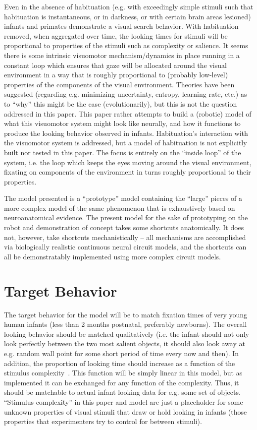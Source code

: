 \documentclass[12pt]{article}
\begin{document}
Even in the absence of habituation (e.g. with exceedingly simple
stimuli such that habituation is instantaneous, or in darkness, or
with certain brain areas lesioned) infants and primates demonstrate a
visual search behavior. With habituation removed, when aggregated over
time, the looking times for stimuli will be proportional to properties
of the stimuli such as complexity or salience. It seems there is some
intrinsic visuomotor mechanism/dynamics in place running in a constant
loop which ensures that gaze will be allocated around the visual
environment in a way that is roughly proportional to (probably
low-level) properties of the components of the visual
environment. Theories have been suggested (regarding e.g. minimizing
uncertainty, entropy, learning rate, etc.) as to ``why'' this might be
the case (evolutionarily), but this is not the question addressed in
this paper. This paper rather attempts to build a (robotic) model of
what this visuomotor system might look like neurally, and how it
functions to produce the looking behavior observed in
infants. Habituation's interaction with the visuomotor system is
addressed, but a model of habituation is not explicitly built nor
tested in this paper. The focus is entirely on the ``inside loop'' of
the system, i.e. the loop which keeps the eyes moving around the
visual environment, fixating on components of the environment in turns
roughly proportional to their properties.

The model presented is a ``prototype'' model containing the ``large''
pieces of a more complex model of the same phenomenon that is
exhaustively based on neuroanatomical evidence. The present model for
the sake of prototyping on the robot and demonstration of concept
takes some shortcuts anatomically. It does not, however, take
shortcuts mechanistically -- all mechanisms are accomplished via
biologically realistic continuous neural circuit models, and the
shortcuts can all be demonstratably implemented using more complex
circuit models.

\section{Target Behavior}
The target behavior for the model will be to match fixation times of
very young human infants (less than 2 months postnatal, preferably
newborns). The overall looking behavior should be matched
qualitatively (i.e.  the infant should not only look perfectly between
the two most salient objects, it should also look away at e.g. random
wall point for some short period of time every now and then). In
addition, the proportion of looking time should increase as a function
of the stimulus complexity~\cite{lewis_kagan_kalafat_1966}. This
function will be simply linear in this model, but as implemented it
can be exchanged for any function of the complexity. Thus, it should
be matchable to actual infant looking data for e.g. some set of
objects. ``Stimulus complexity'' in this paper and model are just a
placeholder for some unknown properties of visual stimuli that draw or
hold looking in infants (those properties that experimenters try to
control for between stimuli).
\end{document}
